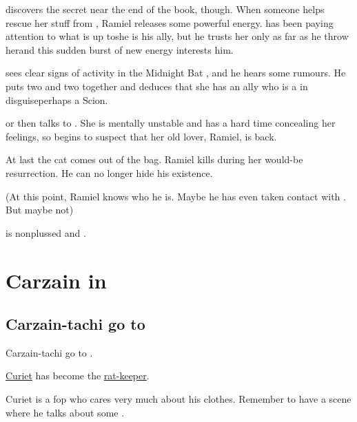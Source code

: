 \begin{garbage}
\Secherdamon{} discovers the secret near the end of the book, though. 
When someone helps \Shiaraid{} rescue her stuff from \Redce, Ramiel releases some powerful energy. 
\Secherdamon{} has been paying attention to what \Shiaraid{} is up to\dash she is his ally, but he trusts her only as far as he throw her\dash and this sudden burst of new energy interests him. 

\Secherdamon{} sees clear signs of activity in the Midnight Bat \matrix, and he hears some rumours. 
He puts two and two together and deduces that she has an ally who is a \resphan{} in disguise\dash perhaps a Scion. 

\Secherdamon{} or \Vizsherioch{} then talks to \Shiaraid. 
She is mentally unstable and has a hard time concealing her feelings, so \Secherdamon{} begins to suspect that her old lover, Ramiel, is back. 

At last the cat comes out of the bag. 
Ramiel kills \Shiaraid{} during her would-be resurrection. 
He can no longer hide his existence. 

(At this point, Ramiel knows who he is. 
 Maybe he has even taken contact with \Cishiel{}. 
 But maybe not) 

\Secherdamon{} is nonplussed and . 


















\section{Carzain in \Redce}









\subsection{Carzain-tachi go to \Redce}
Carzain-tachi go to \Redce. 

\hyperref[Curiet]{Curiet} has become the \hyperref[Curiet becomes rat-keeper]{rat-keeper}.

Curiet is a fop who cares very much about his clothes. Remember to have a scene where he talks about some .






\end{garbage}
